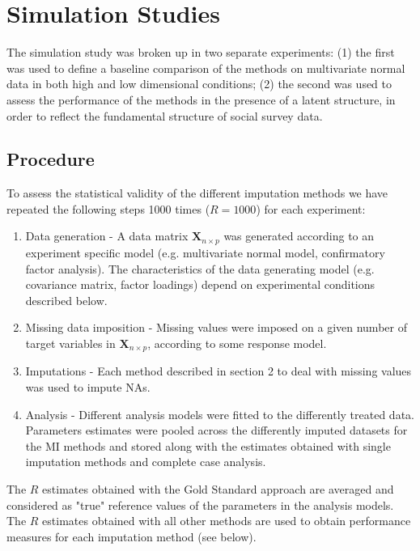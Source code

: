 \section{Simulation Studies}

The simulation study was broken up in two separate experiments: (1) the first was used to define a baseline comparison 
of the methods on multivariate normal data in both high and low dimensional conditions; (2) the second was used to 
assess the performance of the methods in the presence of a latent structure, in order to reflect the fundamental
structure of social survey data.

\subsection{Procedure}
	
	To assess the statistical validity of the different imputation methods we have repeated the following steps
	1000 times ($R = 1000$) for each experiment:

	\begin{enumerate}
		\item Data generation - A data matrix $\bm{X}_{n \times p}$ was generated according to an experiment 
			specific model (e.g. multivariate normal model, confirmatory factor analysis).
			The characteristics of the data generating model (e.g. covariance matrix, factor loadings) 
			depend on experimental conditions described below.
		\item Missing data imposition - Missing values were imposed on a given number of target variables
			in $\bm{X}_{n \times p}$, according to some response model.
		\item Imputations - Each method described in section 2 to deal with missing values was used to impute
			NAs.
		\item Analysis - Different analysis models were fitted to the differently treated data.
			Parameters estimates were pooled across the differently imputed datasets for the MI methods and
			stored along with the estimates obtained with single imputation methods and complete case 
			analysis.
	\end{enumerate}

	The $R$ estimates obtained with the Gold Standard approach are averaged and considered as "true" reference
	values of the parameters in the analysis models.
	The $R$ estimates obtained with all other methods are used to obtain performance measures for each imputation 
	method (see below).

